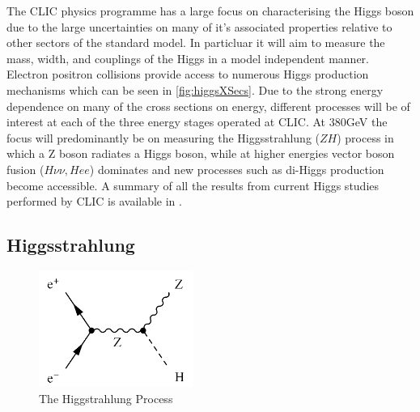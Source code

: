 The CLIC physics programme has a large focus on characterising the Higgs boson due to the large uncertainties on many of it's associated properties relative to other sectors of the standard model. In particluar it will aim to measure the mass, width, and couplings of the Higgs in a model independent manner. Electron positron collisions provide access to numerous Higgs production mechanisms which can be seen in \ref{fig:higgsXSecs}. Due to the strong energy dependence on many of the cross sections on energy, different processes will be of interest at each of the three energy stages operated at CLIC. At 380GeV the focus will predominantly be on measuring the Higgsstrahlung ($ZH$) process in which a Z boson radiates a Higgs boson, while at higher energies vector boson fusion ($H\nu\nu,Hee$) dominates and new processes such as di-Higgs production become accessible. A summary of all the results from current Higgs studies performed by CLIC is available in \cite{Abramowicz:2016zbo}.

\subsection{Higgsstrahlung}

\begin{figure}
  \centering
  \includegraphics[width=0.45\textwidth,keepaspectratio]{Theory/fig/HiggsStrahlung.png}
  \caption[The Higgstrahlung Process]{The Higgstrahlung Process}
  \label{fig:higgsstrahlung}
\end{figure}


